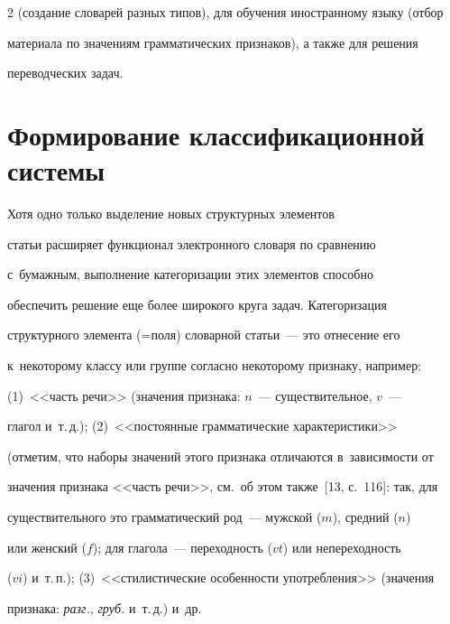 \begin{multicols}{2}
(создание словарей разных типов), для обучения иностранному языку (отбор 


материала по значениям грамматических признаков), а также для решения 


переводческих задач.







  


\section{Формирование классификационной системы}










  Хотя одно только выделение новых структурных элементов 


статьи расширяет функционал электронного словаря по сравнению 


с~бумажным, выполнение категоризации этих элементов способно 


обеспечить решение еще более широкого круга задач. Категоризация 


структурного элемента (=\;по\-ля) словарной статьи~--- это отнесение его 


к~некоторому классу или группе согласно некоторому признаку, например: 


(1)~<<часть речи>> (значения признака: $n$~--- существительное, $v$~--- 


глагол и~т.\,д.); (2)~<<постоянные грамматические характеристики>> 


(отметим, что наборы значений этого признака отличаются в~зависимости от 


значения признака <<часть речи>>, см.\ об этом также~[13, с.~116]: так, для 


существительного это грамматический род~--- мужской ($m$), средний ($n$) 


или женский ($f$); для глагола~--- переходность ($vt$) или непереходность 


($vi$) и~т.\,п.); (3)~<<стилистические особенности упо\-треб\-ле\-ния>> (значения 


признака: \textit{разг.}, \textit{груб.} и~т.\,д.) и~др.



\end{multicols}
